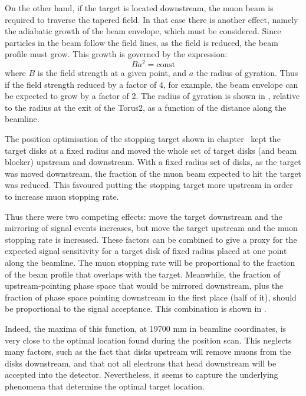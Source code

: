 On the other hand, if the target is located downstream, the muon beam is required to traverse the tapered field.
In that case there is another effect, namely the adiabatic growth of the beam envelope, which must be considered.
Since particles in the beam follow the field lines, as the field is reduced, the beam profile must grow.
This growth is governed by the expression:
\begin{equation}
Ba^2=\textrm{const}
\end{equation}
where $B$ is the field strength at a given point, and $a$ the radius of gyration.
Thus if the field strength reduced by a factor of 4, for example, the beam envelope can be expected to grow by a factor of 2.
The radius of gyration is shown in , relative to the radius at the exit of the Torus2, as a function of the distance along the beamline.

The position optimisation of the stopping target shown in chapter~ kept the target disks at a fixed radius and moved the whole set of target disks (and beam blocker) upstream and downstream.
With a fixed radius set of disks, as the target was moved downstream, the fraction of the muon beam expected to hit the target was reduced.
This favoured putting the stopping target more upstream in order to increase muon stopping rate.

Thus there were two competing effects: move the target downstream and the mirroring of signal events increases, but move the target upstream and the muon stopping rate is increased.
These factors can be combined to give a proxy for the expected signal sensitivity for a target disk of fixed radius placed at one point along the beamline.
The muon stopping rate will be proportional to the fraction of the beam profile that overlaps with the target.
Meanwhile, the fraction of upstream-pointing phase space that would be mirrored downstream, plus the fraction of phase space pointing downstream in the first place (half of it), should be proportional to the signal acceptance.
This combination is shown in .

Indeed, the maxima of this function, at 19700 mm in beamline coordinates, is very close to the optimal location found during the position scan.
This neglects many factors, such as the fact that disks upstream will remove muons from the disks downstream, and that not all electrons that head downstream will be accepted into the detector.
Nevertheless, it seems to capture the underlying phenomena that determine the optimal target location.

